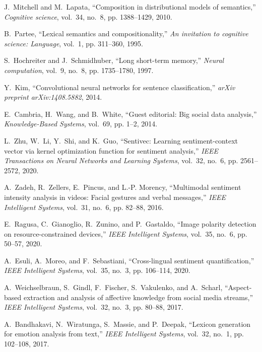 \documentclass[journal]{IEEEtran}
\begin{document}
\begin{thebibliography}{10}
J.~Mitchell and M.~Lapata, ``Composition in distributional models of
  semantics,'' \emph{Cognitive science}, vol.~34, no.~8, pp. 1388--1429, 2010.

B.~Partee, ``Lexical semantics and compositionality,'' \emph{An invitation to
  cognitive science: Language}, vol.~1, pp. 311--360, 1995.

S.~Hochreiter and J.~Schmidhuber, ``Long short-term memory,'' \emph{Neural
  computation}, vol.~9, no.~8, pp. 1735--1780, 1997.

Y.~Kim, ``Convolutional neural networks for sentence classification,''
  \emph{arXiv preprint arXiv:1408.5882}, 2014.

E.~Cambria, H.~Wang, and B.~White, ``Guest editorial: Big social data
  analysis,'' \emph{Knowledge-Based Systems}, vol.~69, pp. 1--2, 2014.

L.~Zhu, W.~Li, Y.~Shi, and K.~Guo, ``Sentivec: Learning sentiment-context
  vector via kernel optimization function for sentiment analysis,'' \emph{IEEE
  Transactions on Neural Networks and Learning Systems}, vol.~32, no.~6, pp.
  2561--2572, 2020.

A.~Zadeh, R.~Zellers, E.~Pincus, and L.-P. Morency, ``Multimodal sentiment
  intensity analysis in videos: Facial gestures and verbal messages,''
  \emph{IEEE Intelligent Systems}, vol.~31, no.~6, pp. 82--88, 2016.

E.~Ragusa, C.~Gianoglio, R.~Zunino, and P.~Gastaldo, ``Image polarity detection
  on resource-constrained devices,'' \emph{{IEEE} Intelligent Systems},
  vol.~35, no.~6, pp. 50--57, 2020.

A.~Esuli, A.~Moreo, and F.~Sebastiani, ``Cross-lingual sentiment
  quantification,'' \emph{{IEEE} Intelligent Systems}, vol.~35, no.~3, pp.
  106--114, 2020.

A.~Weichselbraun, S.~Gindl, F.~Fischer, S.~Vakulenko, and A.~Scharl,
  ``Aspect-based extraction and analysis of affective knowledge from social
  media streams,'' \emph{IEEE Intelligent Systems}, vol.~32, no.~3, pp. 80--88,
  2017.

A.~Bandhakavi, N.~Wiratunga, S.~Massie, and P.~Deepak, ``Lexicon generation for
  emotion analysis from text,'' \emph{IEEE Intelligent Systems}, vol.~32,
  no.~1, pp. 102--108, 2017.


\end{thebibliography}
\end{document}
